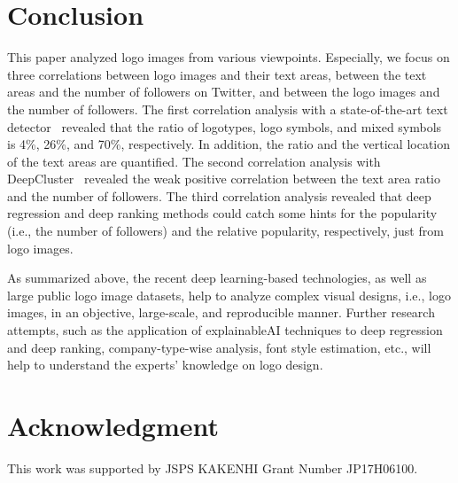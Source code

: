 \documentclass[runningheads]{llncs}
\begin{document}
\section{Conclusion}\label{sec:conclusion}
This paper analyzed logo images from various viewpoints. Especially, we focus on three correlations between logo images and their text areas, between the text areas and the number of followers on Twitter, and between the logo images and the number of followers. The first correlation analysis with a state-of-the-art text detector~\cite{baek2019character} revealed that the ratio of logotypes, logo symbols, and mixed symbols is 4\%, 26\%, and 70\%, respectively. In addition, the ratio and the vertical location of the text areas are quantified. The second correlation analysis with DeepCluster~\cite{Caron2018deepcluster} revealed the weak positive correlation between the text area ratio and the number of followers.
The third correlation analysis revealed that deep regression and deep ranking methods could catch some hints for the popularity (i.e., the number of followers) and the relative popularity, respectively, just from logo images.\par
As summarized above, the recent deep learning-based technologies, as well as large public logo image datasets, help 
to analyze complex visual designs, i.e., logo images, in an objective, large-scale, and reproducible manner. Further research attempts, such as the application of explainableAI techniques to deep regression and deep ranking, company-type-wise analysis, font style estimation, etc., will help to understand the experts' knowledge on logo design.

\section{Acknowledgment}\label{sec:Acknowledgment}
This work was supported by JSPS KAKENHI Grant Number JP17H06100.
%
%
%


%




\end{document}

